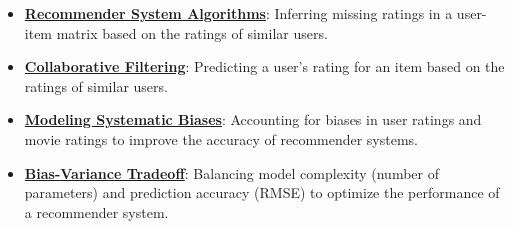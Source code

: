 \documentclass{article}%
\begin{document}
\begin{itemize}[leftmargin=*]
\item \href{https://purdue.brightspace.com/d2l/common/assets/pdfjs-d2l-dist/1.0.14-legacy/web/viewer.html?file=%2Fcontent%2Fenforced%2F1095467-wl.202510.CS.24300.001%2F11L2-svd-pca-recommender.pdf%3Fou%3D1095467&lang=en-us&container=d2l-fileviewer-rendered-pdf&fullscreen=d2l-fileviewer-rendered-pdf-dialog&height=667#page=31}{\textbf{Recommender System Algorithms}}: Inferring missing ratings in a user-item matrix based on the ratings of similar users.%
\item \href{https://purdue.brightspace.com/d2l/common/assets/pdfjs-d2l-dist/1.0.14-legacy/web/viewer.html?file=%2Fcontent%2Fenforced%2F1095467-wl.202510.CS.24300.001%2F11L2-svd-pca-recommender.pdf%3Fou%3D1095467&lang=en-us&container=d2l-fileviewer-rendered-pdf&fullscreen=d2l-fileviewer-rendered-pdf-dialog&height=667#page=33}{\textbf{Collaborative Filtering}}: Predicting a user's rating for an item based on the ratings of similar users.%
\item \href{https://purdue.brightspace.com/d2l/common/assets/pdfjs-d2l-dist/1.0.14-legacy/web/viewer.html?file=%2Fcontent%2Fenforced%2F1095467-wl.202510.CS.24300.001%2F11L2-svd-pca-recommender.pdf%3Fou%3D1095467&lang=en-us&container=d2l-fileviewer-rendered-pdf&fullscreen=d2l-fileviewer-rendered-pdf-dialog&height=667#page=40}{\textbf{Modeling Systematic Biases}}: Accounting for biases in user ratings and movie ratings to improve the accuracy of recommender systems.%
\item \href{https://purdue.brightspace.com/d2l/common/assets/pdfjs-d2l-dist/1.0.14-legacy/web/viewer.html?file=%2Fcontent%2Fenforced%2F1095467-wl.202510.CS.24300.001%2F11L2-svd-pca-recommender.pdf%3Fou%3D1095467&lang=en-us&container=d2l-fileviewer-rendered-pdf&fullscreen=d2l-fileviewer-rendered-pdf-dialog&height=667#page=53}{\textbf{Bias{-}Variance Tradeoff}}: Balancing model complexity (number of parameters) and prediction accuracy (RMSE) to optimize the performance of a recommender system.%
\end{itemize}%
\end{document}
